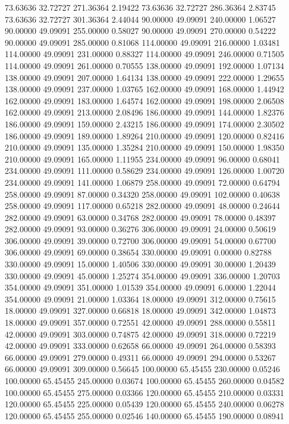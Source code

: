 73.63636 32.72727 271.36364 2.19422
73.63636 32.72727 286.36364 2.83745
73.63636 32.72727 301.36364 2.44044
90.00000 49.09091 240.00000 1.06527
90.00000 49.09091 255.00000 0.58027
90.00000 49.09091 270.00000 0.54222
90.00000 49.09091 285.00000 0.81068
114.00000 49.09091 216.00000 1.03481
114.00000 49.09091 231.00000 0.88327
114.00000 49.09091 246.00000 0.71505
114.00000 49.09091 261.00000 0.70555
138.00000 49.09091 192.00000 1.07134
138.00000 49.09091 207.00000 1.64134
138.00000 49.09091 222.00000 1.29655
138.00000 49.09091 237.00000 1.03765
162.00000 49.09091 168.00000 1.44942
162.00000 49.09091 183.00000 1.64574
162.00000 49.09091 198.00000 2.06508
162.00000 49.09091 213.00000 2.08496
186.00000 49.09091 144.00000 1.82376
186.00000 49.09091 159.00000 2.43215
186.00000 49.09091 174.00000 2.30502
186.00000 49.09091 189.00000 1.89264
210.00000 49.09091 120.00000 0.82416
210.00000 49.09091 135.00000 1.35284
210.00000 49.09091 150.00000 1.98350
210.00000 49.09091 165.00000 1.11955
234.00000 49.09091 96.00000 0.68041
234.00000 49.09091 111.00000 0.58629
234.00000 49.09091 126.00000 1.00720
234.00000 49.09091 141.00000 1.06879
258.00000 49.09091 72.00000 0.64794
258.00000 49.09091 87.00000 0.34320
258.00000 49.09091 102.00000 0.40638
258.00000 49.09091 117.00000 0.65218
282.00000 49.09091 48.00000 0.24644
282.00000 49.09091 63.00000 0.34768
282.00000 49.09091 78.00000 0.48397
282.00000 49.09091 93.00000 0.36276
306.00000 49.09091 24.00000 0.50619
306.00000 49.09091 39.00000 0.72700
306.00000 49.09091 54.00000 0.67700
306.00000 49.09091 69.00000 0.38654
330.00000 49.09091 0.00000 0.82788
330.00000 49.09091 15.00000 1.40506
330.00000 49.09091 30.00000 1.20439
330.00000 49.09091 45.00000 1.25274
354.00000 49.09091 336.00000 1.20703
354.00000 49.09091 351.00000 1.01539
354.00000 49.09091 6.00000 1.22044
354.00000 49.09091 21.00000 1.03364
18.00000 49.09091 312.00000 0.75615
18.00000 49.09091 327.00000 0.66818
18.00000 49.09091 342.00000 1.04873
18.00000 49.09091 357.00000 0.72551
42.00000 49.09091 288.00000 0.55811
42.00000 49.09091 303.00000 0.74875
42.00000 49.09091 318.00000 0.72219
42.00000 49.09091 333.00000 0.62658
66.00000 49.09091 264.00000 0.58393
66.00000 49.09091 279.00000 0.49311
66.00000 49.09091 294.00000 0.53267
66.00000 49.09091 309.00000 0.56645
100.00000 65.45455 230.00000 0.05246
100.00000 65.45455 245.00000 0.03674
100.00000 65.45455 260.00000 0.04582
100.00000 65.45455 275.00000 0.03366
120.00000 65.45455 210.00000 0.03331
120.00000 65.45455 225.00000 0.05439
120.00000 65.45455 240.00000 0.06278
120.00000 65.45455 255.00000 0.02546
140.00000 65.45455 190.00000 0.08941
